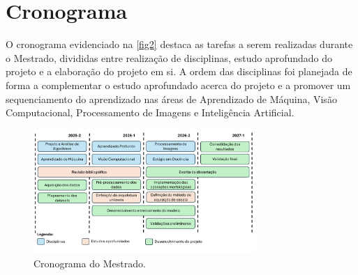 \documentclass[12pt]{article}
\begin{document}
\section{Cronograma}\label{Cronograma}

O cronograma evidenciado na \autoref{fig2} destaca as tarefas a serem realizadas durante o Mestrado, divididas entre realização de disciplinas, estudo aprofundado do projeto e a elaboração do projeto em si. A ordem das disciplinas foi planejada de forma a complementar o estudo aprofundado acerca do projeto e a promover um sequenciamento do aprendizado nas áreas de Aprendizado de Máquina, Visão Computacional, Processamento de Imagens e Inteligência Artificial.


\begin{figure}[H]
  \centering
  \includegraphics[width=0.75\textwidth]{imagens/Cronograma_PPP.pdf}
  \setlength{\abovecaptionskip}{0pt} %
  \vspace{-10pt}
  \caption{Cronograma do Mestrado.}
  \label{fig2}
\end{figure}

\printbibliography
\end{document}
